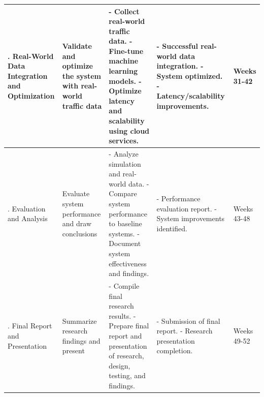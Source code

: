 \documentclass[12pt,a4paper]{article}
\begin{document}
\begin{table}[h!]
    \centering

\begin{tabularx}{1.1\textwidth}
{ 
  | >{\raggedright\arraybackslash}X 
  || >{\raggedright\arraybackslash}X
  | >{\raggedright\arraybackslash}X
  | >{\raggedright\arraybackslash}X
  | >{\raggedright\arraybackslash}X
  |} 
 \hline
 4. Real-World Data Integration and Optimization & Validate and optimize the system with real-world traffic data & - Collect real-world traffic data.\newline
- Fine-tune machine learning models.\newline
- Optimize latency and scalability using cloud services. & - Successful real-world data integration.
- System optimized.\newline
- Latency/scalability improvements. & Weeks 31-42 \\ 
\hline
5. Evaluation and Analysis & Evaluate system performance and draw conclusions & - Analyze simulation and real-world data.\newline
- Compare system performance to baseline systems.\newline
- Document system effectiveness and findings. & - Performance evaluation report.\newline
- System improvements identified. & Weeks 43-48 \\ 
\hline
6. Final Report and Presentation & Summarize research findings and present & - Compile final research results.\newline
- Prepare final report and presentation of research, design, testing, and findings. & - Submission of final report.\newline
- Research presentation completion. & Weeks 49-52 \\ 
\hline
\end{tabularx}
\end{table}

\newpage
\end{document}
